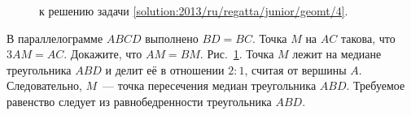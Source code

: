 \ifsolution
\begin{figure}\centering
    \caption{к решению задачи \ref{solution:2013/ru/regatta/junior/geomt/4}.}
    \label{fig:solution:2013/ru/regatta/junior/geomt/4}
\end{figure}
\fi %

\problem
В параллелограмме $ABCD$ выполнено $BD = BC$.
Точка $M$ на $AC$ такова, что $3 AM = AC$.
Докажите, что $AM = BM$.
\solution
\label{solution:2013/ru/regatta/junior/geomt/4}%
Рис.~\ref{fig:solution:2013/ru/regatta/junior/geomt/4}.
Точка $M$ лежит на медиане треугольника $ABD$ и делит её в отношении $2 : 1$,
считая от вершины $A$.
Следовательно, $M$~--- точка пересечения медиан треугольника $ABD$.
Требуемое равенство следует из равнобедренности треугольника $ABD$.
\endproblem
